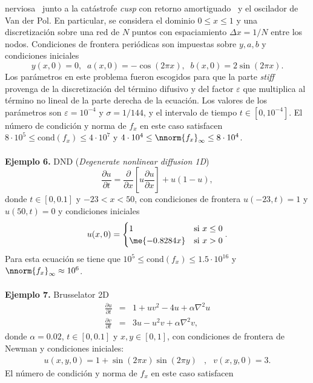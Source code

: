  nerviosa~\cite{cusp1,cusp2} junto a la catástrofe \emph{cusp} con retorno amortiguado~\cite{cusp3} y el oscilador de Van der Pol. En
  particular, se considera el dominio $0\leq x\leq 1$ y una discretización sobre una red de $N$ puntos con espaciamiento $\Delta x=1/N$ entre
   los nodos. Condiciones de frontera periódicas son impuestas sobre $y,a,b$ y condiciones iniciales
\[y(x, 0)=0,\;\;a(x, 0)=-\cos(2\pi x),\;\;b(x, 0)=2\sin(2\pi x).\]
Los parámetros en este problema fueron escogidos para que la parte \emph{stiff} provenga de la discretización del término difusivo y del factor $\varepsilon$ que multiplica al término no lineal de la parte derecha de la ecuación. Los valores de los parámetros son $\varepsilon=10^{-4}$ y $\sigma=1/144$, y el intervalo de tiempo  $t\in [0,10^{-4}]$. El n\'umero de condici\'on y norma de $f_x$ en este caso satisfacen  
	$8\cdot 10 ^5\leq \mathrm{cond}(f_x)\leq 4\cdot 10^7$ y $4\cdot 10^4\leq\nnorm{f_x}_\infty\leq 8\cdot 10^4$.\\ \\
\textbf{Ejemplo 6.} DND (\emph{Degenerate nonlinear diffusion 1D})~\cite{dnd,loffeld2013comparative}\\
\[ \frac{\partial u}{\partial t} = \frac{\partial}{\partial x}\left[ u\frac{\partial u}{\partial x} \right] + u(1-u), \]
donde $t\in[0, 0\mathord{.}1]$ y $-23 < x < 50$, con condiciones de frontera $u(-23,t) = 1$ y $u(50,t)=0$ y condiciones iniciales
\[ u(x,0)=\begin{cases}
1 & \text{si }x\leq 0\\
\me{-0\mathord{.}8284x} & \text{si }x>0
\end{cases}. \]
Para esta ecuación se tiene que $ 10^5\leq \mathrm{cond}(f_x)\leq 1\mathord{.}5\cdot 10^{16}$ y $\nnorm{f_x}_\infty\approx 10^6$.
\\ \\
\textbf{Ejemplo 7.} Brusselator 2D~\cite{bruss,loffeld2013comparative}
\begin{eqnarray*}
	 \frac{\partial u}{\partial t} &=&1+uv^{2}-4u+\alpha \nabla^{2}u\\
	\frac{\partial v}{\partial t}&=&3u-u^{2}v+\alpha \nabla^{2}v,
\end{eqnarray*}
donde $\alpha = 0\mathord{.}02$, $t\in[0, 0\mathord{.}1]$ y $x,y\in[0,1]$,
 con condiciones de frontera de Newman y condiciones iniciales: 
\begin{eqnarray*}
u(x,y,0)=1+\sin(2\pi x)\sin(2\pi y) &,& v(x,y,0)=3.
\end{eqnarray*}
El n\'umero de condici\'on y norma de $f_x$ en este caso satisfacen 
